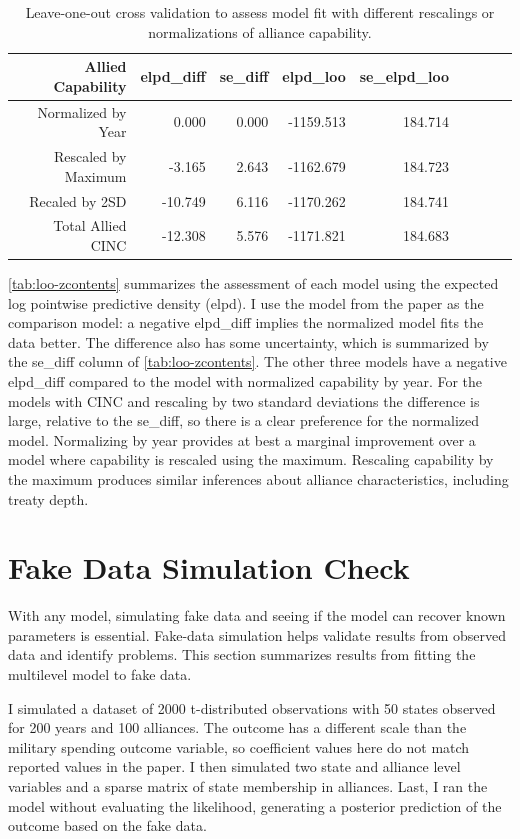 \documentclass[12pt]{article}
\begin{document}
\begin{table}[ht]
\centering
\begin{tabular}{rrrrrrrrr}
  \hline
 Allied Capability & elpd\_diff & se\_diff & elpd\_loo & se\_elpd\_loo  \\ 
  \hline
  Normalized by Year & 0.000 & 0.000 & -1159.513 & 184.714 \\ 
  Rescaled by Maximum & -3.165 & 2.643 & -1162.679 & 184.723  \\ 
  Recaled by 2SD & -10.749 & 6.116 & -1170.262 & 184.741  \\ 
  Total Allied CINC & -12.308 & 5.576 & -1171.821 & 184.683  \\ 
   \hline
\end{tabular}
\caption{Leave-one-out cross validation to assess model fit with different rescalings or normalizations of alliance capability. }
\label{tab:loo-zcontents}
\end{table}

\autoref{tab:loo-zcontents} summarizes the assessment of each model using the expected log pointwise predictive density (elpd). 
I use the model from the paper as the comparison model: a negative elpd\_diff implies the normalized model fits the data better. 
The difference also has some uncertainty, which is summarized by the se\_diff column of \autoref{tab:loo-zcontents}. 
The other three models have a negative elpd\_diff compared to the model with normalized capability by year. 
For the models with CINC and rescaling by two standard deviations the difference is large, relative to the se\_diff, so there is a clear preference for the normalized model. 
Normalizing by year provides at best a marginal improvement over a model where capability is rescaled using the maximum. 
Rescaling capability by the maximum produces similar inferences about alliance characteristics, including treaty depth. 



\section{Fake Data Simulation Check}


With any model, simulating fake data and seeing if the model can recover known parameters is essential. 
Fake-data simulation helps validate results from observed data and identify problems. 
This section summarizes results from fitting the multilevel model to fake data.


I simulated a dataset of 2000 t-distributed observations with 50 states observed for 200 years and 100 alliances. 
The outcome has a different scale than the military spending outcome variable, so coefficient values here do not match reported values in the paper.  
I then simulated two state and alliance level variables and a sparse matrix of state membership in alliances. 
Last, I ran the model without evaluating the likelihood, generating a posterior prediction of the outcome based on the fake data.
\end{document}
